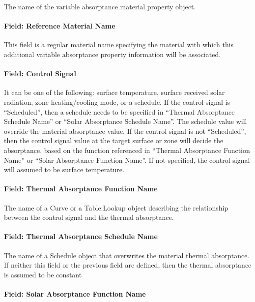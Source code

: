 The name of the variable absorptance material property object.

\paragraph{Field: Reference Material Name}\label{field-reference-material-name-materialpropertyvariableabsorptance}

This field is a regular material name specifying the material with which this additional
variable absorptance property information will be associated.

\paragraph{Field: Control Signal}\label{field-control-signal}

It can be one of the following: surface temperature, surface received solar radiation, zone heating/cooling mode, or a schedule.
If the control signal is ``Scheduled'', then a schedule needs to be specified in ``Thermal Absorptance Schedule Name'' or
``Solar Absorptance Schedule Name''. The schedule value will override the material absorptance value. If the control signal
is not ``Scheduled'', then the control signal value at the target surface or zone will decide the absorptance, based on
the function referenced in ``Thermal Absorptance Function Name'' or ``Solar Absorptance Function Name''. If not specified,
the control signal will assumed to be surface temperature.

\paragraph{Field: Thermal Absorptance Function Name}\label{field-thermal-absorptance-function-name}

The name of a Curve or a Table:Lookup object describing the relationship between the control signal and the thermal absorptance.

\paragraph{Field: Thermal Absorptance Schedule Name}\label{field-thermal-absorptance-schedule-name}

The name of a Schedule object that overwrites the material thermal absorptance.
If neither this field or the previous field are defined, then the thermal absorptance is assumed to be constant

\paragraph{Field: Solar Absorptance Function Name}\label{field-solar-absorptance-function-name}

